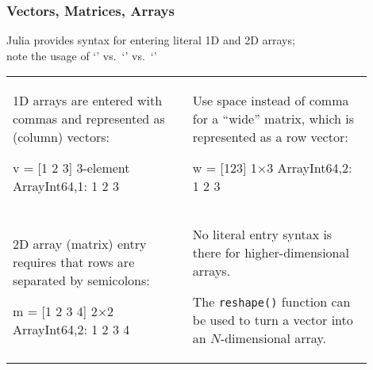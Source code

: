 \documentclass[english,serif,mathserif,xcolor=pdftex,dvipsnames,table]{beamer}
\begin{document}
\begin{frame}
  \frametitle{Vectors, Matrices, Arrays}
  \footnotesize%

  Julia provides syntax for entering literal 1D and 2D arrays; \\
  note the usage of `\texttt{\HL{,}}' vs.~`\texttt{\HL{\space}}'
  vs.~`\texttt{\HL{;}}'

  \+
  \begin{tabular}[t]{p{0.45\linewidth}p{0.45\linewidth}}
    \begin{minipage}{1.0\linewidth}
      \raggedright
      1D arrays are entered with commas and represented as (column) vectors:
      \vspace{-1ex}
\begin{semiverbatim}
\julia v = [1\HL{,} 2\HL{,} 3]
3-element Array{Int64,1}:
 1
 2
 3
\end{semiverbatim}
    \end{minipage}
    &
    \begin{minipage}{1.0\linewidth}
      \vspace{-5ex}
      \raggedright
      Use space instead of comma for a ``wide'' matrix, which is
      represented as a row vector:
      \vspace{-1ex}
\begin{semiverbatim}
\julia w = [1\HL{\space}2\HL{\space}3]
1×3 Array{Int64,2}:
 1  2  3
\end{semiverbatim}
    \end{minipage}
    \\
    \begin{minipage}{1.0\linewidth}
      \vspace{2ex}
      \raggedright
      2D array (matrix) entry requires that rows are separated by semicolons:
      \vspace{-1ex}
\begin{semiverbatim}
\julia m = [1 2\HL{;} 3 4]
2×2 Array{Int64,2}:
 1  2
 3  4
\end{semiverbatim}
    \end{minipage}
    &
    \begin{minipage}{1.0\linewidth}
      \raggedright
      No literal entry syntax is there for higher-dimensional arrays.

      \+
      The \texttt{reshape()} function can be used to turn a vector
      into an $N$-dimensional array.
    \end{minipage}
  \end{tabular}
\end{frame}
\end{document}
